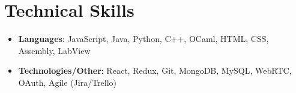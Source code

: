 \documentclass[letterpaper,11pt]{article}
\newcommand{\resumeSubHeadingListStart}{\begin{itemize}[leftmargin=*]}
\newcommand{\resumeSubHeadingListEnd}{\end{itemize}}
\begin{document}
%
\section{Technical Skills}
 \resumeSubHeadingListStart
   \item{
     \textbf{Languages}{: JavaScript, Java, Python, C++, OCaml, HTML, CSS, Assembly, LabView}
   }
   \item{
     \textbf{Technologies/Other}{: React, Redux, Git, MongoDB, MySQL, WebRTC, OAuth, Agile (Jira/Trello)}
   }
 \resumeSubHeadingListEnd


\end{document}
